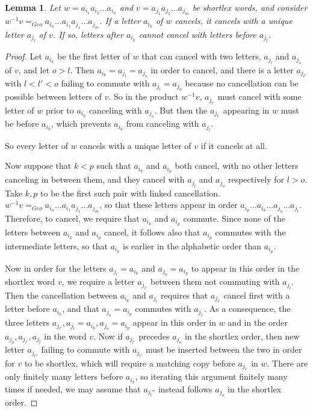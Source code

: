 \documentclass{amsart}
\newtheorem{lemma}[theorem]{Lemma}
\theoremstyle{definition}
\theoremstyle{remark}
\begin{document}
	
	\begin{lemma}\label{ShortlexNonLinking}
		Let $w=a_{i_1}a_{i_2}...a_{i_n}$ and $v=a_{j_1}a_{j_2}...a_{j_m}$ be shortlex words, and consider $w^{-1}v=_{Geo}a_{i_n}...a_{i_1}a_{j_1}...a_{j_m}$. If a letter $a_{i_k}$ of $w$ cancels, it cancels with a unique letter $a_{j_l}$ of $v$. If so, letters after $a_{i_k}$ cannot cancel with letters before $a_{j_l}$.		
	\end{lemma}
	
	\begin{proof}
		Let $a_{i_k}$ be the first letter of $w$ that can cancel with two letters, $a_{j_l}$ and $a_{j_{o}}$ of $v$, and let $o>l$. Then $a_{i_k}=a_{j_l}=a_{j_{o}}$ in order to cancel, and there is a letter $a_{j_{l'}}$ with $l<l'<o$ failing to commute with $a_{j_l}=a_{j_{o}}$ because no cancellation can be possible between letters of $v$. So in the product $w^{-1}v$, $a_{j_{l'}}$ must cancel with some letter of $w$ prior to $a_{i_k}$ canceling with $a_{j_{o}}$. But then the $a_{j_{l'}}$ appearing in $w$ must be before $a_{i_k}$, which prevents $a_{i_k}$ from canceling with $a_{j_l}$.
		
		So every letter of $w$ cancels with a unique letter of $v$ if it cancels at all. 
		
		Now suppose that $k<p$ such that $a_{i_k}$ and $a_{i_p}$ both cancel, with no other letters canceling in between them, and they cancel with $a_{j_l}$ and $a_{j_o}$ respectively for $l>o$. Take $k, p$ to be the first such pair with linked cancellation.  $w^{-1}v=_{Geo}a_{i_n}...a_{i_1}a_{j_1}...a_{j_m}$, so that these letters appear in order $a_{i_{p}}...a_{i_k}...a_{j_o}...a_{j_{l}}$. Therefore, to cancel, we require that $a_{i_k}$ and $a_{i_p}$ commute. Since none of the letters between $a_{i_k}$ and $a_{i_{p}}$ cancel, it follows also that $a_{i_{p}}$ commutes with the intermediate letters, so that $a_{i_k}$ is earlier in the alphabetic order than $a_{i_{p}}$. 
		
		Now in order for the letters $a_{j_l}=a_{i_{k}}$ and $a_{j_{o}}=a_{i_p}$ to appear in this order in the shortlex word $v$, we require a letter $a_{j_{l'}}$ between them not commuting with $a_{j_{l}}$. Then the cancellation between $a_{i_k}$ and $a_{j_{l}}$ requires that $a_{j_{l'}}$ cancel first with a letter before $a_{i_k}$, and that $a_{j_o}=a_{i_{p}}$ commutes with $a_{j_{l'}}$. As a consequence, the three letters $a_{j_{l'}}, a_{j_{l}}=a_{i_k}, a_{j_o}=a_{i_p}$ appear in this order in $w$ and in the order $a_{j_o}, a_{j_{l'}}, a_{j_{l}}$ in the word $v$. Now if $a_{j_{l'}}$ precedes $a_{j_o}$ in the shortlex order, then new letter $a_{j_{l''}}$ failing to commute with $a_{j_{l'}}$ must be inserted between the two in order for $v$ to be shortlex, which will require a matching copy before $a_{j_{l'}}$ in $w$. There are only finitely many letters before $a_{i_k}$, so iterating this argument finitely many times if needed, we may assume that $a_{j_l''}$ instead follows $a_{j_o}$ in the shortlex order.
		

\end{proof}
\end{document}
